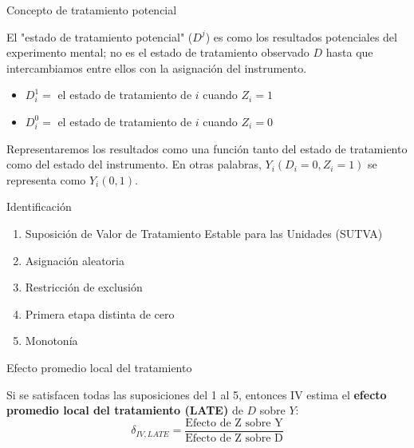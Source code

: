 \documentclass{beamer}
\begin{document}
\begin{frame}{Concepto de tratamiento potencial}
	
El "estado de tratamiento potencial" ($D^j$) es como los resultados potenciales del experimento mental; no es el estado de tratamiento observado $D$ hasta que intercambiamos entre ellos con la asignación del instrumento.
\bigskip
		\begin{itemize}
		\item $D^1_{i} =$ el estado de tratamiento de $i$ cuando $Z_i=1$
		\item $D^0_{i} =$ el estado de tratamiento de $i$ cuando $Z_i=0$
		\end{itemize}
\bigskip
Representaremos los resultados como una función tanto del estado de tratamiento como del estado del instrumento. En otras palabras, $Y_i(D_i=0,Z_i=1)$ se representa como $Y_i(0,1)$.

\end{frame}

\begin{frame}{Identificación}
		
	\begin{enumerate}
	\item Suposición de Valor de Tratamiento Estable para las Unidades (SUTVA)
	\item Asignación aleatoria
	\item Restricción de exclusión
	\item Primera etapa distinta de cero
	\item Monotonía
	\end{enumerate}
\end{frame}


\begin{frame}{Efecto promedio local del tratamiento}

	Si se satisfacen todas las suposiciones del 1 al 5, entonces IV estima el \textbf{efecto promedio local del tratamiento (LATE)} de $D$ sobre $Y$: $$\delta_{IV,LATE} =\frac{\text{Efecto de Z sobre Y}}{\text{Efecto de Z sobre D}}$$

\end{frame}	
\end{document}
